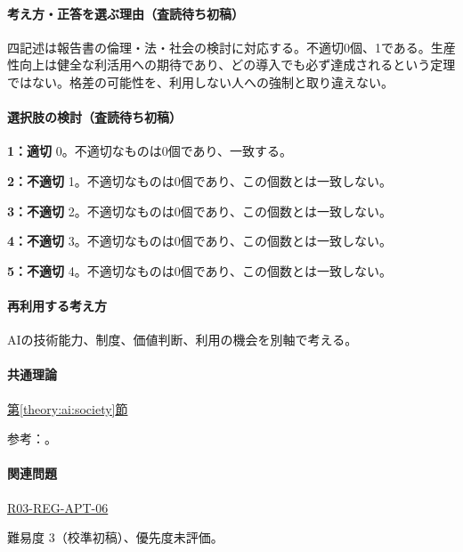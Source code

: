 \paragraph{考え方・正答を選ぶ理由（査読待ち初稿）} 四記述は報告書の倫理・法・社会の検討に対応する。不適切0個、1である。生産性向上は健全な利活用への期待であり、どの導入でも必ず達成されるという定理ではない。格差の可能性を、利用しない人への強制と取り違えない。

\paragraph{選択肢の検討（査読待ち初稿）}\mbox{}\par

\noindent\textbf{1：適切} 0。不適切なものは0個であり、一致する。\par

\noindent\textbf{2：不適切} 1。不適切なものは0個であり、この個数とは一致しない。\par

\noindent\textbf{3：不適切} 2。不適切なものは0個であり、この個数とは一致しない。\par

\noindent\textbf{4：不適切} 3。不適切なものは0個であり、この個数とは一致しない。\par

\noindent\textbf{5：不適切} 4。不適切なものは0個であり、この個数とは一致しない。\par

\paragraph{再利用する考え方} AIの技術能力、制度、価値判断、利用の機会を別軸で考える。

\paragraph{共通理論} \hyperref[theory:ai:society]{第\ref*{theory:ai:society}節}

\par 参考：\cite{ai_society2017}。

\paragraph{関連問題} \hyperref[q:r03-reg-apt-06]{R03-REG-APT-06}

\par 難易度 3（校準初稿）、優先度未評価。


